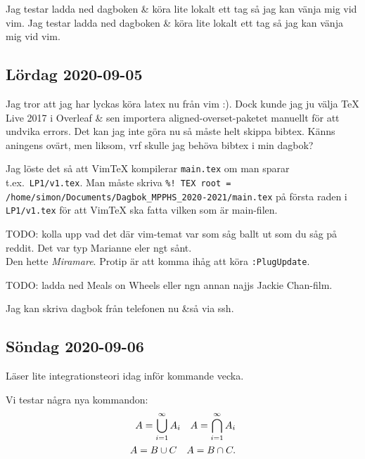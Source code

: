 Jag testar ladda ned dagboken \& köra lite lokalt ett tag så  jag kan vänja mig vid vim. Jag testar ladda ned dagboken \& köra lite lokalt ett tag så  jag kan vänja mig vid vim.

\subsection{Lördag 2020-09-05}

Jag tror att jag har lyckas köra latex nu från vim :). Dock kunde jag ju välja TeX Live 2017 i Overleaf \& sen importera aligned-overset-paketet manuellt för att undvika errors. Det kan jag inte göra nu så måste helt skippa bibtex. Känns aningens ovärt, men liksom, vrf skulle jag behöva bibtex i min dagbok?

Jag löste det så att VimTeX kompilerar \verb|main.tex| om man sparar t.ex.\ \verb|LP1/v1.tex|. Man måste skriva \verb|%! TEX root = /home/simon/Documents/Dagbok_MPPHS_2020-2021/main.tex| på första raden i \verb|LP1/v1.tex| för att VimTeX ska fatta vilken som är main-filen.

TODO: kolla upp vad det där vim-temat var som såg ballt ut som du såg på reddit. Det var typ Marianne eler ngt sånt. \checkmark\\
Den hette \emph{Miramare}. Protip är att komma ihåg att köra \verb|:PlugUpdate|.

TODO: ladda ned Meals on Wheels eller ngn annan najjs Jackie Chan-film.

\bigskip

Jag kan skriva dagbok från telefonen nu \&så via ssh.


\subsection{Söndag 2020-09-06}

Läser lite integrationsteori idag inför kommande vecka.

Vi testar några nya kommandon:
\begin{align}
	A = \bigcup\limits_{i = 1}^\infty A_i \quad A = \bigcap\limits_{i = 1}^\infty A_i\\
	A = B \cup C \quad A = B \cap C.
\end{align}

